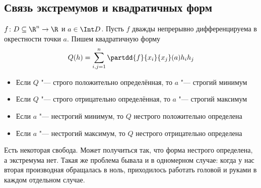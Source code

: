 \subsection{Связь экстремумов и квадратичных форм}
\begin{theorem}
	$f \colon D \subseteq \R^n \to \R$ и $a \in \Int D$.
	Пусть $f$ дважды непрерывно дифференцируема в окрестности точки $a$.
	Пишем квадратичную форму
	\[
		Q(h) = \sum_{i,j=1}^n \partdd{f}{x_i}{x_j} (a) h_i h_j
	\]
	\begin{itemize}
	\item Если $Q$ "--- строго положительно определённая, то $a$ "--- строгий минимум
	\item Если $Q$ "--- строго отрицательно определённая, то $a$ "--- строгий максимум
	\item Если $a$ "--- нестрогий минимум, то $Q$ нестрого положительно определена
	\item Если $a$ "--- нестрогий максимум, то $Q$ нестрого отрицательно определена
	\end{itemize}
\end{theorem}
\begin{Rem}
	Есть некоторая свобода.
	Может получиться так, что форма нестрого определена, а экстремума нет.
	Такая же проблема бывала и в одномерном случае: когда у нас вторая производная обращалась в ноль,
	приходилось работать головой и руками в каждом отдельном случае.
\end{Rem}

